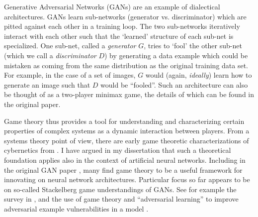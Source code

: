 \documentclass[11pt, oneside]{article}   	%
\begin{document}
Generative Adversarial Networks (GANs) are an example of dialectical architectures.  GANs learn sub-networks (generator vs. discriminator) which are pitted against each other in a training loop.  The two sub-networks iteratively interact with each other such that the `learned' structure of each sub-net is specialized.  One sub-net, called a \emph{generator} $G$, tries to `fool' the other sub-net (which we call a \emph{discriminator} $D$) by generating a data example which could be mistaken as coming from the same distribution as the original training data set.  For example, in the case of a set of images, $G$ would (again, \emph{ideally}) learn how to generate an image such that $D$ would be ``fooled''.  Such an architecture can also be thought of as a two-player minimax game, the details of which can be found in the original paper.  \citep{GANS2014}


Game theory thus provides a tool for understanding and characterizing certain properties of complex systems as a dynamic interaction between players.  From a systems theory point of view, there are early game theoretic characterizations of cybernetics from \citep{Ashby1958}. I have argued in my dissertation that such a theoretical foundation applies also in the context of artificial neural networks.  \citep{Beebe2021}  Including in the original GAN paper \citep{GANS2014}, many find game theory to be a useful framework for innovating on neural network architectures.  Particular focus so far appears to be on so-called Stackelberg game understandings of GANs.  See for example the survey in \citep{GameTheoryDLSurvey2022}, and the use of game theory and ``adversarial learning'' to improve adversarial example vulnerabilities in a model \citep{AdversarialLearning2021}.









\end{document}

